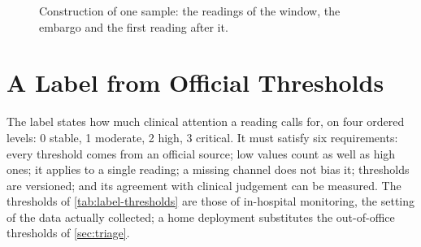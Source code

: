 \documentclass[11pt,a4paper,oneside]{report}
\begin{document}
\begin{figure}[htbp]
\centering
{}
\caption{Construction of one sample: the readings of the window, the embargo and the first reading after it.}\label{fig:window-embargo}
\end{figure}

\section{A Label from Official Thresholds}\label{sec:labelling}\label{sec:label-rules}

The label states how much clinical attention a reading calls for, on four ordered levels: 0 stable, 1 moderate, 2 high, 3 critical. It must satisfy six requirements: every threshold comes from an official source; low values count as well as high ones; it applies to a single reading; a missing channel does not bias it; thresholds are versioned; and its agreement with clinical judgement can be measured. The thresholds of \cref{tab:label-thresholds} are those of in-hospital monitoring, the setting of the data actually collected; a home deployment substitutes the out-of-office thresholds of \cref{sec:triage}.
\end{document}
